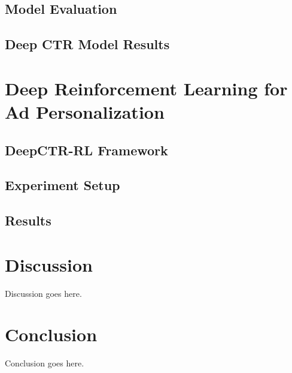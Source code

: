 \documentclass{mldsmsc}
\begin{document}
\section{Model Evaluation}

\section{Deep CTR Model Results}

\chapter{Deep Reinforcement Learning for Ad Personalization}
\label{chap:deep-rl-for-ad-personalization}

\section{DeepCTR-RL Framework}

\section{Experiment Setup}

\section{Results}

\chapter{Discussion}
\label{chap:discussion}

Discussion goes here.

\chapter{Conclusion}


Conclusion goes here. 





\clearpage
\renewcommand*{\thepage}{A\arabic{page}}

%
%




\end{document}
